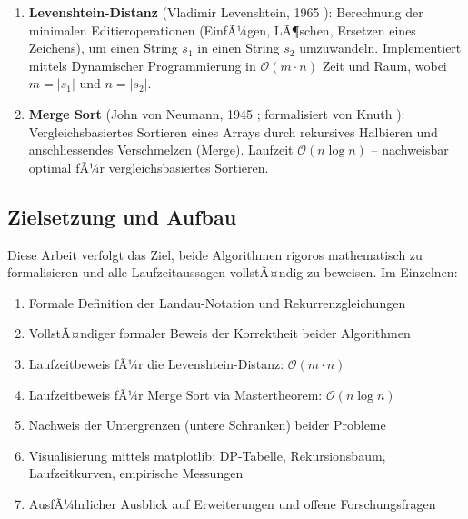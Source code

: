 ﻿\documentclass[a4paper,12pt]{article}
\theoremstyle{definition}
\begin{document}
\begin{enumerate}
    \item \textbf{Levenshtein-Distanz} (Vladimir Levenshtein, 1965
          \cite{levenshtein1965}): Berechnung der minimalen Editieroperationen
          (EinfÃ¼gen, LÃ¶schen, Ersetzen eines Zeichens), um einen String $s_1$
          in einen String $s_2$ umzuwandeln. Implementiert mittels Dynamischer
          Programmierung in $\mathcal{O}(m \cdot n)$ Zeit und Raum,
          wobei $m = |s_1|$ und $n = |s_2|$.
    \item \textbf{Merge Sort} (John von Neumann, 1945 \cite{vonneumann1945};
          formalisiert von Knuth \cite{knuth1998}): Vergleichsbasiertes Sortieren
          eines Arrays durch rekursives Halbieren und anschliessendes Verschmelzen
          (Merge). Laufzeit $\mathcal{O}(n \log n)$ -- nachweisbar optimal fÃ¼r
          vergleichsbasiertes Sortieren.
\end{enumerate}

\subsection{Zielsetzung und Aufbau}

Diese Arbeit verfolgt das Ziel, beide Algorithmen rigoros mathematisch zu
formalisieren und alle Laufzeitaussagen vollstÃ¤ndig zu beweisen. Im Einzelnen:
\begin{enumerate}
    \item Formale Definition der Landau-Notation und Rekurrenzgleichungen
    \item VollstÃ¤ndiger formaler Beweis der Korrektheit beider Algorithmen
    \item Laufzeitbeweis fÃ¼r die Levenshtein-Distanz: $\mathcal{O}(m \cdot n)$
    \item Laufzeitbeweis fÃ¼r Merge Sort via Mastertheorem: $\mathcal{O}(n \log n)$
    \item Nachweis der Untergrenzen (untere Schranken) beider Probleme
    \item Visualisierung mittels matplotlib: DP-Tabelle, Rekursionsbaum,
          Laufzeitkurven, empirische Messungen
    \item AusfÃ¼hrlicher Ausblick auf Erweiterungen und offene Forschungsfragen
\end{enumerate}

\end{document}
